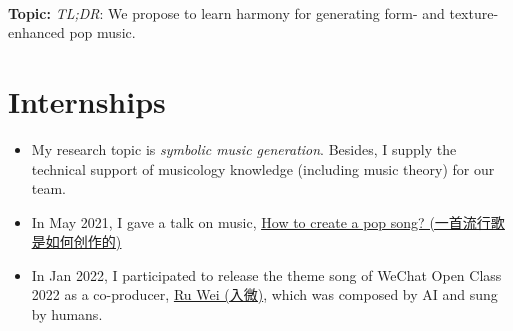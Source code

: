 \documentclass{resume}
\begin{document}
{{{\textbf{\\ \large Topic: }
{\small {}
}
\small
\textit{TL;DR}: We propose to learn harmony for generating form- and texture- enhanced pop music.


\section{Internships}
{\small {}
}
\begin{itemize}
  \item My research topic is \textit{symbolic music generation}. Besides, I supply the technical support of musicology knowledge (including music theory) for our team. 
  \item In May 2021, I gave a talk on music, \href{https://www.zhangxueyao.com/data/wcpr-pop-music.pdf}{\underline{How to create a pop song? (一首流行歌是如何创作的)}}
  \item In Jan 2022, I participated to release the theme song of WeChat Open Class 2022 as a co-producer, \href{https://y.qq.com/n/ryqq/songDetail/000xeNJ53orPG2}{Ru Wei (入微)}, which was composed by AI and sung by humans.
\end{itemize}

}}}
\end{document}
